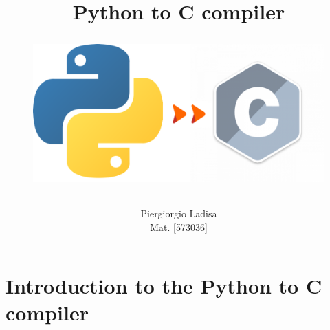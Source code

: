 \documentclass[a4paper,12pt,,titlepage,openright]{report}
\begin{document}
\title{\textbf{\Huge {Python to C compiler}}
\\
\begin{figure}[htbp]
\centering
\includegraphics[width=1.1\textwidth]{pytoc.png}
\end{figure}}

\author{Piergiorgio Ladisa \\
Mat. [573036]}
\maketitle
\tableofcontents
\listoffigures

\chapter{Introduction to the Python to C compiler}
\end{document}
